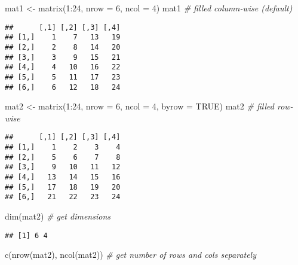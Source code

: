 \documentclass[
  oneside]{book}
\newenvironment{Shaded}{\begin{snugshade}}{\end{snugshade}}
\newcommand{\AttributeTok}[1]{\textcolor[rgb]{0.77,0.63,0.00}{#1}}
\newcommand{\CommentTok}[1]{\textcolor[rgb]{0.56,0.35,0.01}{\textit{#1}}}
\newcommand{\ConstantTok}[1]{\textcolor[rgb]{0.00,0.00,0.00}{#1}}
\newcommand{\DecValTok}[1]{\textcolor[rgb]{0.00,0.00,0.81}{#1}}
\newcommand{\FunctionTok}[1]{\textcolor[rgb]{0.00,0.00,0.00}{#1}}
\newcommand{\NormalTok}[1]{#1}
\newcommand{\OtherTok}[1]{\textcolor[rgb]{0.56,0.35,0.01}{#1}}
\newcommand{\SpecialCharTok}[1]{\textcolor[rgb]{0.00,0.00,0.00}{#1}}
\begin{document}
\begin{Shaded}
\begin{Highlighting}[]
\NormalTok{mat1 }\OtherTok{\textless{}{-}} \FunctionTok{matrix}\NormalTok{(}\DecValTok{1}\SpecialCharTok{:}\DecValTok{24}\NormalTok{,}
               \AttributeTok{nrow =} \DecValTok{6}\NormalTok{, }\AttributeTok{ncol =} \DecValTok{4}\NormalTok{)}
\NormalTok{mat1 }\CommentTok{\# filled column{-}wise (default)}
\end{Highlighting}
\end{Shaded}

\begin{verbatim}
##      [,1] [,2] [,3] [,4]
## [1,]    1    7   13   19
## [2,]    2    8   14   20
## [3,]    3    9   15   21
## [4,]    4   10   16   22
## [5,]    5   11   17   23
## [6,]    6   12   18   24
\end{verbatim}

\begin{Shaded}
\begin{Highlighting}[]
\NormalTok{mat2 }\OtherTok{\textless{}{-}} \FunctionTok{matrix}\NormalTok{(}\DecValTok{1}\SpecialCharTok{:}\DecValTok{24}\NormalTok{,}
               \AttributeTok{nrow =} \DecValTok{6}\NormalTok{, }\AttributeTok{ncol =} \DecValTok{4}\NormalTok{, }\AttributeTok{byrow =} \ConstantTok{TRUE}\NormalTok{)}
\NormalTok{mat2 }\CommentTok{\# filled row{-}wise}
\end{Highlighting}
\end{Shaded}

\begin{verbatim}
##      [,1] [,2] [,3] [,4]
## [1,]    1    2    3    4
## [2,]    5    6    7    8
## [3,]    9   10   11   12
## [4,]   13   14   15   16
## [5,]   17   18   19   20
## [6,]   21   22   23   24
\end{verbatim}

\begin{Shaded}
\begin{Highlighting}[]
\FunctionTok{dim}\NormalTok{(mat2) }\CommentTok{\# get dimensions}
\end{Highlighting}
\end{Shaded}

\begin{verbatim}
## [1] 6 4
\end{verbatim}

\begin{Shaded}
\begin{Highlighting}[]
\FunctionTok{c}\NormalTok{(}\FunctionTok{nrow}\NormalTok{(mat2), }\FunctionTok{ncol}\NormalTok{(mat2)) }\CommentTok{\# get number of rows and cols separately}
\end{Highlighting}
\end{Shaded}
\end{document}

